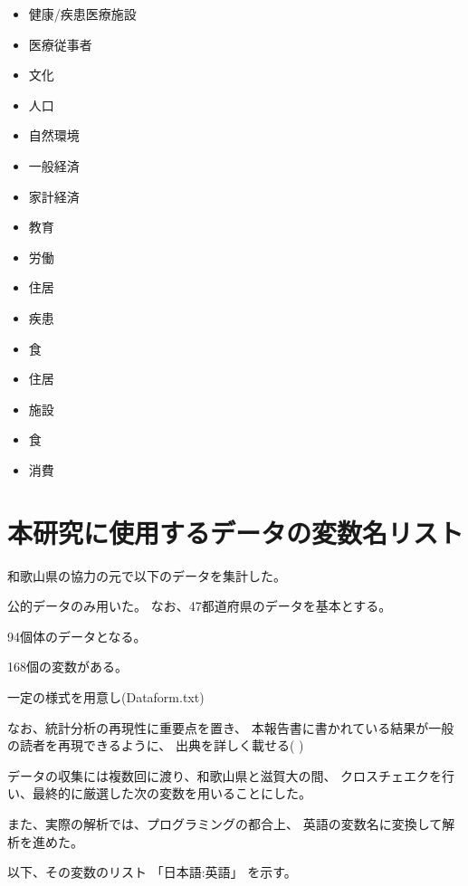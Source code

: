 \begin{itemize}
	\item  健康/疾患医療施設
	\item  医療従事者
	\item  文化
	\item  人口
	\item  自然環境
	\item  一般経済
	\item  家計経済
	\item  教育
	\item  労働
	\item  住居
	\item  疾患
	\item  食
	\item  住居
	\item  施設
	\item  食
	\item  消費
\end{itemize}









\chapter{本研究に使用するデータの変数名リスト}
\label{datalist}

和歌山県の協力の元で以下のデータを集計した。



公的データのみ用いた。
なお、47都道府県のデータを基本とする。

94個体のデータとなる。

168個の変数がある。


一定の様式を用意し(Dataform.txt)

なお、統計分析の再現性に重要点を置き、
本報告書に書かれている結果が一般の読者を再現できるように、
出典を詳しく載せる(
)

データの収集には複数回に渡り、和歌山県と滋賀大の間、
クロスチェエクを行い、最終的に厳選した次の変数を用いることにした。

また、実際の解析では、プログラミングの都合上、
英語の変数名に変換して解析を進めた。


以下、その変数のリスト
「日本語:英語」
を示す。



